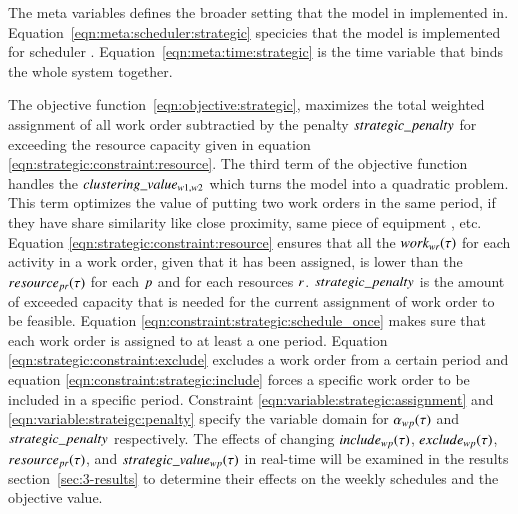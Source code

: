 The meta variables defines the broader setting that the model in implemented in.
Equation~\eqref{eqn:meta:scheduler:strategic} specicies that the model is
implemented for scheduler \ElementScheduler. 
Equation~\eqref{eqn:meta:time:strategic} is the time variable that binds the whole
system together.

The objective function~\eqref{eqn:objective:strategic},  maximizes the total
weighted assignment of all work order subtractied by the penalty $strategic\_penalty$
for exceeding the resource capacity given in equation
\eqref{eqn:strategic:constraint:resource}. The third term of the objective
function handles the $clustering\_value_{w1, w2}$ which turns the model into a quadratic
problem. This term optimizes the value of putting two work orders in the same
period, if they have share similarity like close proximity, same piece of equipment
, etc.  Equation \eqref{eqn:strategic:constraint:resource} ensures
that all the $work_{wr}(\tau)$ for each activity in a work
order, given that it has been assigned, is lower than the $\ParStrategicResource$ for each
$p$ and for each resources $r$. $strategic\_penalty$ is the
amount of exceeded capacity that is needed for the current assignment of work
order to be feasible. Equation \eqref{eqn:constraint:strategic:schedule_once}
makes sure that each work order is assigned to at least a one
period. Equation \eqref{eqn:strategic:constraint:exclude}
excludes a work order from a certain period and equation
\eqref{eqn:constraint:strategic:include} forces a specific work order to be
included in a specific period. Constraint \eqref{eqn:variable:strategic:assignment}
and \eqref{eqn:variable:strateigc:penalty} specify the variable domain
for $\alpha_{wp}(\tau)$
and $strategic\_penalty$ respectively. The effects of changing $
	include_{wp}(\tau)$, $exclude_{wp}(\tau)$, $\ParStrategicResource$, and $
	strategic\_value_{w p}(\tau)$ in real-time will be examined in the results section~\ref{sec:3-results} to
determine their effects on the weekly schedules and the objective value.
